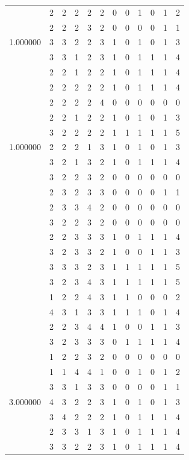 \documentclass[]{book}
\theoremstyle{definition}
\theoremstyle{definition}
\theoremstyle{definition}
\theoremstyle{remark}
\begin{document}
\begin{table}
{\begin{tabular}[t]{rrrrrrrrrrrr}
 & 2 & 2 & 2 & 2 & 2 & 0 & 0 & 1 & 0 & 1 & 2\\
 & 2 & 2 & 2 & 3 & 2 & 0 & 0 & 0 & 0 & 1 & 1\\
1.000000 & 3 & 3 & 2 & 2 & 3 & 1 & 0 & 1 & 0 & 1 & 3\\
 & 3 & 3 & 1 & 2 & 3 & 1 & 0 & 1 & 1 & 1 & 4\\
 & 2 & 2 & 1 & 2 & 2 & 1 & 0 & 1 & 1 & 1 & 4\\
 & 2 & 2 & 2 & 2 & 2 & 1 & 0 & 1 & 1 & 1 & 4\\
 & 2 & 2 & 2 & 2 & 4 & 0 & 0 & 0 & 0 & 0 & 0\\
 & 2 & 2 & 1 & 2 & 2 & 1 & 0 & 1 & 0 & 1 & 3\\
 & 3 & 2 & 2 & 2 & 2 & 1 & 1 & 1 & 1 & 1 & 5\\
1.000000 & 2 & 2 & 2 & 1 & 3 & 1 & 0 & 1 & 0 & 1 & 3\\
 & 3 & 2 & 1 & 3 & 2 & 1 & 0 & 1 & 1 & 1 & 4\\
 & 3 & 2 & 2 & 3 & 2 & 0 & 0 & 0 & 0 & 0 & 0\\
 & 2 & 3 & 2 & 3 & 3 & 0 & 0 & 0 & 0 & 1 & 1\\
 & 2 & 3 & 3 & 4 & 2 & 0 & 0 & 0 & 0 & 0 & 0\\
 & 3 & 2 & 2 & 3 & 2 & 0 & 0 & 0 & 0 & 0 & 0\\
 & 2 & 2 & 3 & 3 & 3 & 1 & 0 & 1 & 1 & 1 & 4\\
 & 3 & 2 & 3 & 3 & 2 & 1 & 0 & 0 & 1 & 1 & 3\\
 & 3 & 3 & 3 & 2 & 3 & 1 & 1 & 1 & 1 & 1 & 5\\
 & 3 & 2 & 3 & 4 & 3 & 1 & 1 & 1 & 1 & 1 & 5\\
 & 1 & 2 & 2 & 4 & 3 & 1 & 1 & 0 & 0 & 0 & 2\\
 & 4 & 3 & 1 & 3 & 3 & 1 & 1 & 1 & 0 & 1 & 4\\
 & 2 & 2 & 3 & 4 & 4 & 1 & 0 & 0 & 1 & 1 & 3\\
 & 3 & 2 & 3 & 3 & 3 & 0 & 1 & 1 & 1 & 1 & 4\\
 & 1 & 2 & 2 & 3 & 2 & 0 & 0 & 0 & 0 & 0 & 0\\
 & 1 & 1 & 4 & 4 & 1 & 0 & 0 & 1 & 0 & 1 & 2\\
 & 3 & 3 & 1 & 3 & 3 & 0 & 0 & 0 & 0 & 1 & 1\\
3.000000 & 4 & 3 & 2 & 2 & 3 & 1 & 0 & 1 & 0 & 1 & 3\\
 & 3 & 4 & 2 & 2 & 2 & 1 & 0 & 1 & 1 & 1 & 4\\
 & 2 & 3 & 3 & 1 & 3 & 1 & 0 & 1 & 1 & 1 & 4\\
 & 3 & 3 & 2 & 2 & 3 & 1 & 0 & 1 & 1 & 1 & 4\\

\end{tabular}}
\end{table}
\end{document}
